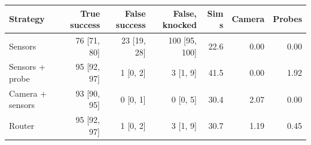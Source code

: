\begin{tabular}{lrrrrrr}
\toprule
Strategy & True success & False success & False, knocked & Sim s & Camera & Probes \\
\midrule
Sensors & 76 [71, 80] & 23 [19, 28] & 100 [95, 100] & 22.6 & 0.00 & 0.00 \\
Sensors + probe & 95 [92, 97] & 1 [0, 2] & 3 [1, 9] & 41.5 & 0.00 & 1.92 \\
Camera + sensors & 93 [90, 95] & 0 [0, 1] & 0 [0, 5] & 30.4 & 2.07 & 0.00 \\
Router & 95 [92, 97] & 1 [0, 2] & 3 [1, 9] & 30.7 & 1.19 & 0.45 \\
\bottomrule
\end{tabular}
